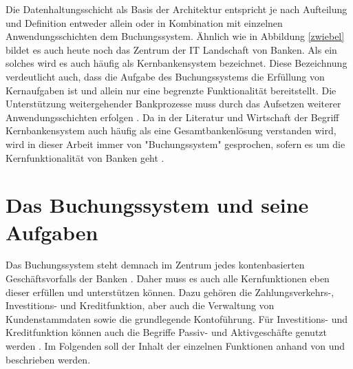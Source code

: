 \documentclass[12pt,oneside,a4paper,parskip]{scrbook}
\begin{document}
Die Datenhaltungsschicht als Basis der Architektur entspricht je nach Aufteilung und Definition entweder allein oder in Kombination mit einzelnen Anwendungsschichten dem Buchungssystem. Ähnlich wie in Abbildung \ref{zwiebel} bildet es auch heute noch das Zentrum der IT Landschaft von Banken. Als ein solches wird es auch häufig als Kernbankensystem bezeichnet. Diese Bezeichnung verdeutlicht auch, dass die Aufgabe des Buchungssystems die Erfüllung von Kernaufgaben ist und allein nur eine begrenzte Funktionalität bereitstellt. Die Unterstützung weitergehender Bankprozesse muss durch das Aufsetzen weiterer Anwendungsschichten erfolgen \cite[58]{ITidF}. Da in der Literatur und Wirtschaft der Begriff Kernbankensystem auch häufig als eine Gesamtbankenlösung verstanden wird, wird in dieser Arbeit immer von "Buchungssystem" gesprochen, sofern es um die Kernfunktionalität von Banken geht \cite{vergleichCoreBanking}.  


\section{Das Buchungssystem und seine Aufgaben}
Das Buchungssystem steht demnach im Zentrum jedes kontenbasierten Geschäftsvorfalls der Banken \cite{bankEnzy}. Daher muss es auch alle Kernfunktionen eben dieser erfüllen und unterstützen können. Dazu gehören die Zahlungsverkehrs-, Investitions- und Kreditfunktion, aber auch die Verwaltung von Kundenstammdaten sowie die grundlegende Kontoführung. Für Investitions- und Kreditfunktion können auch die Begriffe Passiv- und Aktivgeschäfte genutzt werden \cite[12, 86]{DdF}\cite{einfuehrungKernbanksystem}. Im Folgenden soll der Inhalt der einzelnen Funktionen anhand von \cite[69-88]{DdF} und \cite[91-153]{bankwirtschaft} beschrieben werden.
\end{document}
